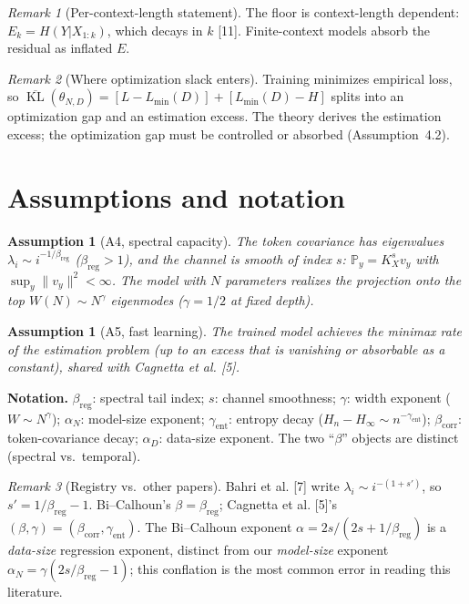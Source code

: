 \documentclass[12pt]{article}
\newcommand{\KL}{\operatorname{KL}}
\newcommand{\Prob}{\mathbb{P}}
\newtheorem{assumption}[theorem]{Assumption}
\theoremstyle{remark}
\newtheorem{remark}{Remark}
\begin{document}
\begin{remark}[Per-context-length statement]
\label{rem:perlength}
The floor is context-length dependent: $E_k=H(Y|X_{1:k})$, which decays in $k$
[11].  Finite-context models absorb the residual as inflated
$E$.
\end{remark}

\begin{remark}[Where optimization slack enters]
\label{rem:slack}
Training minimizes empirical loss, so
$\overline{\KL}(\theta_{N,D})=[L-L_{\min}(D)]+[L_{\min}(D)-H]$ splits into an
optimization gap and an estimation excess.  The theory derives the estimation
excess; the optimization gap must be controlled or absorbed
(Assumption~4.2).
\end{remark}

\section{Assumptions and notation}
\label{sec:assumptions}

\begin{assumption}[A4, spectral capacity]
\label{ass:spectral}
The token covariance has eigenvalues $\lambda_i\sim i^{-1/\beta_{\mathrm{reg}}}$
($\beta_{\mathrm{reg}}>1$), and the channel is smooth of index $s$:
$\Prob_{y}=K_X^s v_y$ with $\sup_y\|v_y\|^2<\infty$.  The model with $N$
parameters realizes the projection onto the top $W(N)\!\sim\!N^{\gamma}$
eigenmodes ($\gamma\!=\!1/2$ at fixed depth).
\end{assumption}

\begin{assumption}[A5, fast learning]
\label{ass:fastlearn}
The trained model achieves the minimax rate of the estimation problem
(up to an excess that is vanishing or absorbable as a constant), shared with
Cagnetta et al. [5].
\end{assumption}

\noindent\textbf{Notation.}
$\beta_{\mathrm{reg}}$: spectral tail index;
$s$: channel smoothness;
$\gamma$: width exponent ($W\!\sim\!N^{\gamma}$);
$\alpha_N$: model-size exponent;
$\gamma_{\mathrm{ent}}$: entropy decay ($H_n\!-\!H_\infty\!\sim\!n^{-\gamma_{\mathrm{ent}}}$);
$\beta_{\mathrm{corr}}$: token-covariance decay;
$\alpha_D$: data-size exponent.  The two ``$\beta$'' objects are distinct
(spectral vs.\ temporal).

\begin{remark}[Registry vs.\ other papers]
\label{rem:registry}
Bahri et al. [7] write $\lambda_i\sim i^{-(1+s')}$, so
$s'=1/\beta_{\mathrm{reg}}-1$. Bi--Calhoun's $\beta=\beta_{\mathrm{reg}}$;
Cagnetta et al. [5]'s $(\beta,\gamma)=(\beta_{\mathrm{corr}},\gamma_{\mathrm{ent}})$.
The Bi--Calhoun exponent $\alpha=2s/(2s+1/\beta_{\mathrm{reg}})$ is a
\emph{data-size} regression exponent, distinct from our \emph{model-size}
exponent $\alpha_N=\gamma(2s/\beta_{\mathrm{reg}}-1)$; this conflation is the most
common error in reading this literature.
\end{remark}
\end{document}
